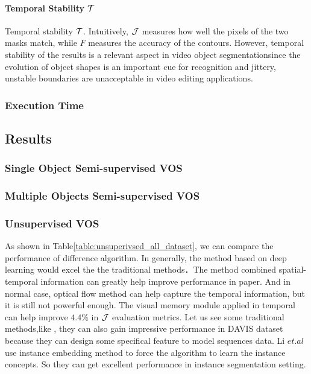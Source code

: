 \paragraph{Temporal Stability $\mathcal{T}$}
Temporal stability $\mathcal{T}$. Intuitively, $\mathcal{J}$ measures how well the pixels of the two masks match, while $F$ measures the
accuracy of the contours. However, temporal stability of the results is a relevant aspect in video object segmentationsince the evolution of object shapes is an important cue for
recognition and jittery, unstable boundaries are unacceptable in video editing applications. 

\subsubsection{Execution Time}

\subsection{Results}


\subsubsection{Single Object Semi-supervised VOS}

\subsubsection{Multiple Objects Semi-supervised VOS}

\subsubsection{Unsupervised VOS}
As shown in Table\ref{table:unsuperivsed_all_dataset}, we can compare the performance of difference algorithm. In generally, the method based on deep learning would excel the the traditional 
methods．The method combined spatial-temporal information can greatly help improve performance in paper\cite{Tokmakov2017Learning}. And in normal case, optical flow method can help capture the 
temporal information, but it is still not powerful enough. The visual memory module applied in temporal can help improve $4.4\%$ in $\mathcal{J}$ evaluation metrics. Let us see some traditional methods,like
\cite{Koh2017Primary,li2018instance}, they can also gain impressive performance in DAVIS dataset because they can design some specifical feature to model sequences data. Li $et.al$ use instance embedding method
to force the algorithm to learn the instance concepts. So they can get excellent performance in instance segmentation setting.

